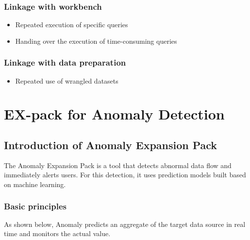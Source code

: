 \documentclass[letterpaper,10pt,english]{sphinxmanual}
\begin{document}
\section{Linkage with workbench}
\label{\detokenize{integrator/part05/index:id2}}\begin{itemize}
\item {} 
Repeated execution of specific queries

\item {} 
Handing over the execution of time-consuming queries

\end{itemize}


\section{Linkage with data preparation}
\label{\detokenize{integrator/part05/index:id3}}\begin{itemize}
\item {} 
Repeated use of wrangled datasets

\end{itemize}


\part{EX-pack for Anomaly Detection}
\label{\detokenize{index:ex-pack-for-anomaly-detection}}

\chapter{Introduction of Anomaly Expansion Pack}
\label{\detokenize{anomaly/part01/index:anomaly}}\label{\detokenize{anomaly/part01/index::doc}}
The Anomaly Expansion Pack is a tool that detects abnormal data flow and immediately alerts users. For this detection, it uses prediction models built based on machine learning.


\section{Basic principles}
\label{\detokenize{anomaly/part01/index:basic-principles}}\label{\detokenize{anomaly/part01/index:id1}}
As shown below, Anomaly predicts an aggregate of the target data source in real time and monitors the actual value.
\begin{quote}

\begin{figure}[H]
\centering

\noindent{}
\end{figure}
\end{quote}
\end{document}
